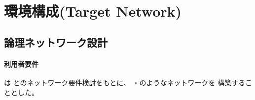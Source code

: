  \section{環境構成(Target Network)}


  \subsection{論理ネットワーク設計}
  \label{sec:logical-nw-design}

  \paragraph{利用者要件}
\tj は \yo とのネットワーク要件検討をもとに、
・のようなネットワークを
構築することとした。

